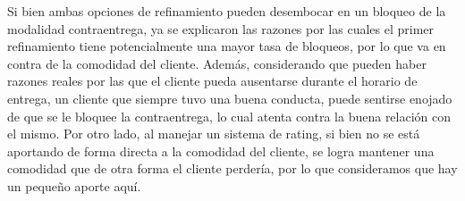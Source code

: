 Si bien ambas opciones de refinamiento pueden desembocar en un bloqueo de la
modalidad contraentrega, ya se explicaron las razones por las cuales el primer
refinamiento tiene potencialmente una mayor tasa de bloqueos, por lo que va en
contra de la comodidad del cliente. Además, considerando que pueden haber
razones reales por las que el cliente pueda ausentarse durante el horario de
entrega, un cliente que siempre tuvo una buena conducta, puede sentirse
enojado de que se le bloquee la contraentrega, lo cual atenta contra la buena
relación con el mismo. Por otro lado, al manejar un sistema de rating, si bien
no se está aportando de forma directa a la comodidad del cliente, se logra
mantener una comodidad que de otra forma el cliente perdería, por lo que
consideramos que hay un pequeño aporte aquí.